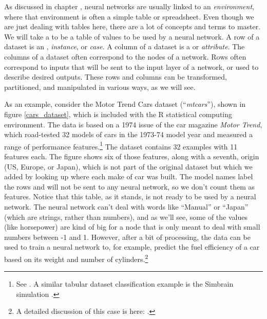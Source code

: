 As discussed in chapter , neural networks are usually linked to an \emph{environment}, where that environment is often a simple table or spreadsheet. Even though we are just dealing with tables here, there are a lot of concepts and terms to master. We will take a   to be a table of values to be used by a neural network. A row of a dataset is an , \emph{instance}, or \emph{case}. A column of a dataset is a  or \emph{attribute}. The columns of a dataset often correspond to the nodes of a network. Rows often correspond to inputs that will be sent to the input layer of a network, or used to describe desired outputs. These rows and columns can be transformed, partitioned, and manipulated in various ways, as we will see. 
  
As an example, consider the Motor Trend Cars dataset  (``\emph{mtcars}''),  shown in figure \ref{cars_dataset}, which is included with the R statistical computing environment. The data is based on a 1974 issue of the car magazine \emph{Motor Trend}, which road-tested 32 models of cars in the 1973-74 model year and measured a range of performance features.\footnote{See . A similar tabular dataset classification example is the Simbrain simulation .} The dataset contains 32 examples with 11 features each. The figure shows six of those features, along with a seventh, origin (US, Europe, or Japan), which is not part of the original dataset but which we added by looking up where each make of car was built. The model names label the rows and will not be sent to any neural network, so we don't count them as features. Notice that this table, as it stands, is not ready to be used by a neural network. The neural network can't deal with words like ``Manual'' or ``Japan'' (which are strings, rather than numbers), and as we'll see, some of the values (like horsepower) are kind of big for a node that is only meant to deal with small numbers between -1 and 1. However, after a bit of processing, the data can be used to train a neural network to, for example, predict the fuel efficiency of a car based on its weight and number of cylinders.\footnote{A detailed discussion of this case is here: .}

